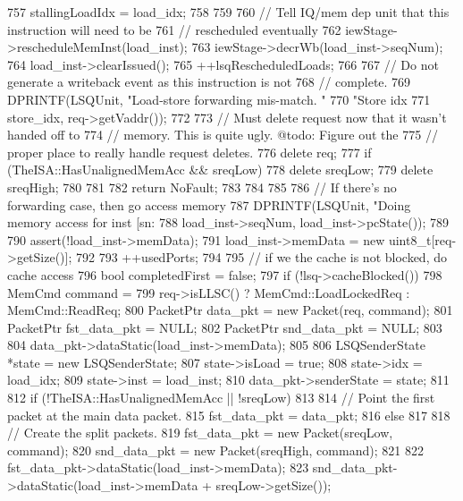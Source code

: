 \begin{DoxyCode}
{{{{757                 stallingLoadIdx = load_idx;
758             }
759 
760             // Tell IQ/mem dep unit that this instruction will need to be
761             // rescheduled eventually
762             iewStage->rescheduleMemInst(load_inst);
763             iewStage->decrWb(load_inst->seqNum);
764             load_inst->clearIssued();
765             ++lsqRescheduledLoads;
766 
767             // Do not generate a writeback event as this instruction is not
768             // complete.
769             DPRINTF(LSQUnit, "Load-store forwarding mis-match. "
770                     "Store idx %
771                     store_idx, req->getVaddr());
772 
773             // Must delete request now that it wasn't handed off to
774             // memory.  This is quite ugly.  @todo: Figure out the
775             // proper place to really handle request deletes.
776             delete req;
777             if (TheISA::HasUnalignedMemAcc && sreqLow) {
778                 delete sreqLow;
779                 delete sreqHigh;
780             }
781 
782             return NoFault;
783         }
784     }
785 
786     // If there's no forwarding case, then go access memory
787     DPRINTF(LSQUnit, "Doing memory access for inst [sn:%
788             load_inst->seqNum, load_inst->pcState());
789 
790     assert(!load_inst->memData);
791     load_inst->memData = new uint8_t[req->getSize()];
792 
793     ++usedPorts;
794 
795     // if we the cache is not blocked, do cache access
796     bool completedFirst = false;
797     if (!lsq->cacheBlocked()) {
798         MemCmd command =
799             req->isLLSC() ? MemCmd::LoadLockedReq : MemCmd::ReadReq;
800         PacketPtr data_pkt = new Packet(req, command);
801         PacketPtr fst_data_pkt = NULL;
802         PacketPtr snd_data_pkt = NULL;
803 
804         data_pkt->dataStatic(load_inst->memData);
805 
806         LSQSenderState *state = new LSQSenderState;
807         state->isLoad = true;
808         state->idx = load_idx;
809         state->inst = load_inst;
810         data_pkt->senderState = state;
811 
812         if (!TheISA::HasUnalignedMemAcc || !sreqLow) {
813 
814             // Point the first packet at the main data packet.
815             fst_data_pkt = data_pkt;
816         } else {
817 
818             // Create the split packets.
819             fst_data_pkt = new Packet(sreqLow, command);
820             snd_data_pkt = new Packet(sreqHigh, command);
821 
822             fst_data_pkt->dataStatic(load_inst->memData);
823             snd_data_pkt->dataStatic(load_inst->memData + sreqLow->getSize());
}}}
\end{DoxyCode}
